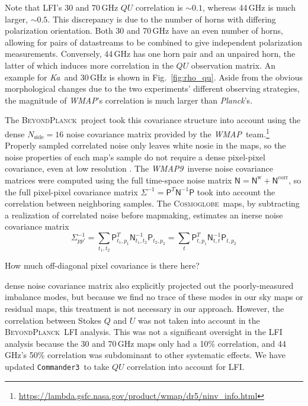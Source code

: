\documentclass[twocolumn]{../../common/aa}
\def\WMAP{\emph{WMAP}}
\def\WMAPnine{\emph{WMAP9}}
\def\Planck{\emph{Planck}}
\def\commanderthree{\texttt{Commander3}}
\newcommand{\BP}{\textsc{BeyondPlanck}}
\newcommand{\cosmoglobe}{\textsc{Cosmoglobe}}
\newcommand{\Ka}[0]{\textit{Ka}}
\begin{document}
Note that LFI's 30 and 70\,GHz $QU$ correlation is $\sim0.1$, whereas 44\,GHz is much larger, $\sim0.5$. This discrepancy is due to the number of horns with differing polarization orientation. Both 30 and 70\,GHz have an even number of horns, allowing for pairs of datastreams to be combined to give independent polarization measurements. Conversely, 44\,GHz has one horn pair and an unpaired horn, the latter of which induces more correlation in the $QU$ observation matrix. An example for \Ka\ and 30\,GHz is shown in Fig.~\ref{fig:rho_qu}. Aside from the obvious morphological changes due to the two experiments' different observing strategies, the magnitude of \WMAP's correlation is much larger than \Planck's.

The \BP\ project took this covariance structure into account using the dense $N_\mathrm{side}=16$ noise covariance matrix provided by the \WMAP\ team.\footnote{\url{https://lambda.gsfc.nasa.gov/product/wmap/dr5/ninv_info.html}} Properly sampled correlated noise only leaves white nosie in the maps, so the noise properties of each map's sample do not require a dense pixel-pixel covariance, even at low resolution \citep{bp01, bp10}. 
The \WMAPnine\ inverse noise covariance matrices were computed using the full time-space noise matrix $\mathsf N=\mathsf N^\mathrm w+\mathsf N^\mathrm{corr}$, so the full pixel-pixel covariance matrix $\Sigma^{-1}=\mathsf P^T\mathsf N^{-1}\mathsf P$ took into account the correlation between neighboring samples. The \cosmoglobe\ maps, by subtracting a realization of correlated noise before mapmaking, estimates an inerse noise covariance matrix
\begin{equation}
	\Sigma^{-1}_{pp'}
	=\sum_{t_1,t_2}\mathsf P_{t_1,p_1}^T\mathsf N_{t_1,t_2}^{-1}\mathsf P_{t_2,p_2}
	=\sum_t\mathsf P_{t,p_1}^T\mathsf N_{t,t}^{-1}\mathsf P_{t,p_2}
\end{equation}

How much off-diagonal pixel covariance is there here?

dense noise covariance matrix also explicitly projected out the poorly-measured imbalance modes, but because we find no trace of these modes in our sky maps or residual maps, this treatment is not necessary in our approach. However, the correlation between Stokes $Q$ and $U$ was not taken into account in the \BP\ LFI analysis. This was not a significant oversight in the LFI analysis because the 30 and 70\,GHz maps only had a 10\% correlation, and 44\,GHz's 50\% correlation was subdominant to other systematic effects. We have updated \commanderthree\ to take $QU$ correlation into account for LFI.
\end{document}
